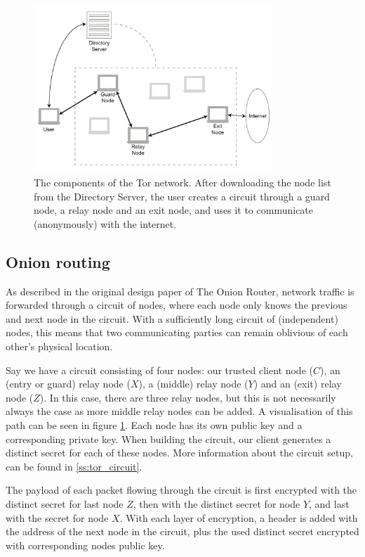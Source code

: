 \documentclass{article}
\begin{document}
	\begin{figure}[!t]
		\centering
		\includegraphics[width=0.8\textwidth]{graphics/tor.pdf}
		\caption{The components of the Tor network. After downloading the node list from the Directory Server, the user creates a circuit through a guard node, a relay node and an exit node, and uses it to communicate (anonymously) with the internet.}
		\label{fig:tor_layout}
	\end{figure}

	\subsection{Onion routing}
		As described in the original design paper of The Onion Router, network traffic is forwarded through a circuit of nodes, where each node only knows the previous and next node in the circuit. With a sufficiently long circuit of (independent) nodes, this means that two communicating parties can remain oblivious of each other's physical location.
		
		Say we have a circuit consisting of four nodes: our trusted client node ($C$), an (entry or guard) relay node ($X$), a (middle) relay node ($Y$) and an (exit) relay node ($Z$). In this case, there are three relay nodes, but this is not necessarily always the case as more middle relay nodes can be added. A visualisation of this path can be seen in figure \ref{fig:tor_layout}. Each node has its own public key and a corresponding private key. When building the circuit, our client generates a distinct secret for each of these nodes. More information about the circuit setup, can be found in \ref{ss:tor_circuit}.
		
		The payload of each packet flowing through the circuit is first encrypted with the distinct secret for last node $Z$, then with the distinct secret for node $Y$, and last with the secret for node $X$. With each layer of encryption, a header is added with the address of the next node in the circuit, plus the used distinct secret encrypted with corresponding nodes public key. 
		
\end{document}
